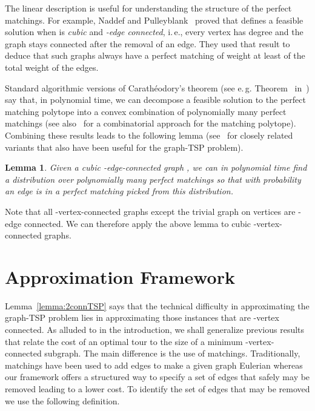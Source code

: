\documentclass[letterpaper,11pt]{article}
\newtheorem{lemma}[theorem]{Lemma}
\newcommand{\TSP}{graph-TSP\xspace}
\begin{document}
    The linear description is useful for understanding the structure of
    the perfect matchings. For example, Naddef and Pulleyblank~\cite{NP81}
    proved that  defines a feasible solution when  is
    \emph{cubic} and \emph{-edge connected}, i.\,e., every vertex has
    degree  and the graph stays connected after the removal of an
    edge. They used that result to deduce that such graphs always have a
    perfect matching of weight at least  of the total weight of the
    edges.

    Standard algorithmic versions of Carath\'{e}odory's theorem (see
    e.\,g. Theorem~ in~\cite{GLS1988}) say that, in polynomial time, we can
    decompose a feasible solution to the perfect matching polytope into a
    convex combination of polynomially many perfect matchings (see
    also~\cite{Barahona04} for a combinatorial approach for the matching
    polytope).
    Combining these results leads to the following lemma (see~\cite{BSSS11,GLS05,MMP90} for
    closely related variants that also have  been useful for the
    \TSP problem).
    \begin{lemma}
    \label{lem:matching}
      Given a cubic -edge-connected graph , we can in polynomial time
      find a distribution over polynomially many perfect matchings so that
      with probability  an edge is in a  perfect matching picked from this distribution.
    \end{lemma}
    Note that all -vertex-connected graphs except the trivial graph on
     vertices are -edge connected. We can therefore apply the above
    lemma to cubic -vertex-connected graphs.

    \vspace{-0.2cm}
\section{Approximation  Framework}
\label{sec:tspframework}
Lemma~\ref{lemma:2connTSP} says that the technical difficulty in
approximating the \TSP problem lies in approximating those instances
that are -vertex connected.
As alluded to in the introduction, we shall generalize previous
results~\cite{FJJ89,MMP90} that relate the cost of an optimal tour to
the size of a minimum -vertex-connected subgraph. The main
difference is the use of matchings. Traditionally, matchings have been
used to add edges to make a given graph Eulerian whereas our framework
offers a structured way to specify a set of edges that safely may be
removed leading to a lower cost. To identify the set of edges that may
be removed we use the following definition.
\end{document}
